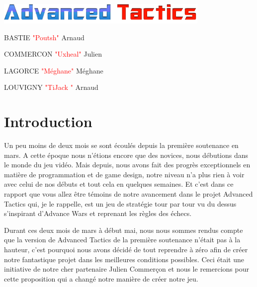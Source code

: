\documentclass{article}
\begin{document}
\thispagestyle{empty}
\begin{center}
\end{center}

\hspace*{0mm}\vfill
\begin{center}
\includegraphics[scale=0.3]{logo}
\end{center}
\vfill\hspace*{0mm}

\fontsize{14}{14}
\begin{center}
BASTIE \textcolor{red}{"Poutsh"} Arnaud 
\end{center}
\begin{center}
COMMERCON \textcolor{red}{"Uxheal"} Julien
\end{center}
\begin{center}
LAGORCE \textcolor{red}{"Méghane"} Méghane
\end{center}
\begin{center}
LOUVIGNY \textcolor{red}{"TiJack "} Arnaud
\end{center}

\newpage
\thispagestyle{empty}
\tableofcontents

\newpage
\fontsize{12}{12}
\section{Introduction}

\par
Un peu moins de deux mois se sont écoulés depuis la première soutenance en mars. A cette époque nous n'étions encore que des novices, nous débutions dans le monde du jeu vidéo. Mais depuis, nous avons fait des progrès exceptionnels en matière de programmation et de game design, notre niveau n'a plus rien à voir 
avec celui de nos débuts et tout cela en quelques semaines. Et c'est dans ce rapport que vous allez être témoins de notre avancement dans le projet Advanced Tactics qui, je le rappelle, est un jeu de stratégie tour par tour vu du dessus s'inspirant d'Advance Wars et reprenant les règles des échecs.
\newline

\par
Durant ces deux mois de mars à début mai, nous nous sommes rendus compte que la version de Advanced Tactics de la première soutenance n'était pas à la hauteur, c'est pourquoi nous avons décidé de tout reprendre à zéro afin de créer notre fantastique projet dans les meilleures conditions possibles. Ceci était une initiative
de notre cher partenaire Julien Commerçon et nous le remercions pour cette proposition qui a changé notre manière de créer notre jeu.
\newline
\end{document}
